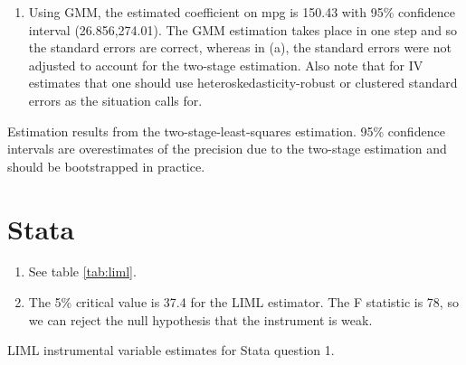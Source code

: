\documentclass{article}
\begin{document}
\begin{enumerate}
\begin{enumerate}[label=(\alph*)]
\end{enumerate}
\item Using GMM, the estimated coefficient on mpg is 150.43 with 95\% confidence interval (26.856,274.01).  The GMM estimation takes place in one step and so the standard errors are correct, whereas in (a), the standard errors were not adjusted to account for the two-stage estimation.  Also note that for IV estimates that one should use heteroskedasticity-robust or clustered standard errors as the situation calls for.
\end{enumerate}

\begin{table}[ht!]
    \centering
    
    \caption{Estimation results from the two-stage-least-squares estimation.  95\% confidence intervals are overestimates of the precision due to the two-stage estimation and should be bootstrapped in practice.}
    \label{tab:hw5ivoutput}
\end{table}

\section{Stata}

\begin{enumerate}
    \item See table \ref{tab:liml}.
    \item The 5\% critical value is 37.4 for the LIML estimator.  The F statistic is 78, so we can reject the null hypothesis that the instrument is weak.
\end{enumerate}

\begin{table}[hb]
    \centering
    
    \caption{LIML instrumental variable estimates for Stata question 1.}
    \label{tab:liml}
\end{table}
\end{document}
